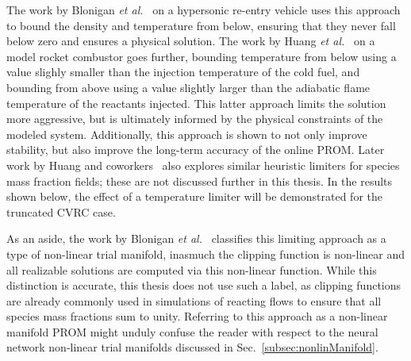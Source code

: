 The work by Blonigan \textit{et al.}~\cite{Blonigan2020} on a hypersonic re-entry vehicle uses this approach to bound the density and temperature from below, ensuring that they never fall below zero and ensures a physical solution. The work by Huang \textit{et al.}~\cite{Huang2019} on a model rocket combustor goes further, bounding temperature from below using a value slighly smaller than the injection temperature of the cold fuel, and bounding from above using a value slightly larger than the adiabatic flame temperature of the reactants injected. This latter approach limits the solution more aggressive, but is ultimately informed by the physical constraints of the modeled system. Additionally, this approach is shown to not only improve stability, but also improve the long-term accuracy of the online PROM. Later work by Huang and coworkers~\cite{Huang2020,Huang2022} also explores similar heuristic limiters for species mass fraction fields; these are not discussed further in this thesis. In the results shown below, the effect of a temperature limiter will be demonstrated for the truncated CVRC case.

As an aside, the work by Blonigan \textit{et al.}~\cite{Blonigan2020} classifies this limiting approach as a type of non-linear trial manifold, inasmuch the clipping function is non-linear and all realizable solutions are computed via this non-linear function. While this distinction is accurate, this thesis does not use such a label, as clipping functions are already commonly used in simulations of reacting flows to ensure that all species mass fractions sum to unity. Referring to this approach as a non-linear manifold PROM might unduly confuse the reader with respect to the neural network non-linear trial manifolds discussed in Sec.~\ref{subsec:nonlinManifold}.